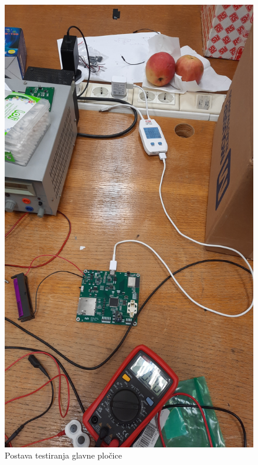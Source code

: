 \begin{figure}[htb]
    \centering
    \includegraphics[width=10 cm]{Figures/MB_TEST_02.jpg}
    \caption{Postava testiranja glavne pločice}
    \label{slk:MB_TEST_02}
\end{figure}